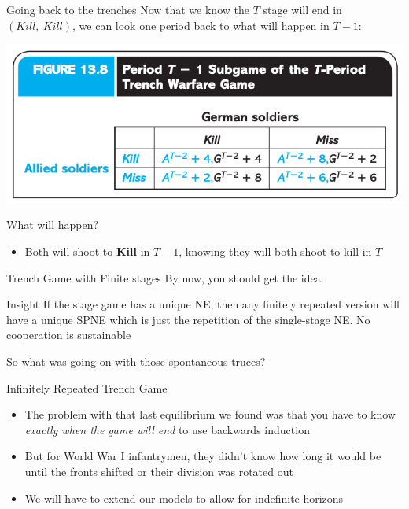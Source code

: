 \begin{frame}{Going back to the trenches}
  Now that we know the $T$ stage will end in $(Kill, ~Kill)$, we can look one period back to what will happen in $T-1$: 
  \begin{center}
    \includegraphics[width=.7\textwidth]{figures/fig138.png}
  \end{center}
  What will happen?
  \pause
  \begin{itemize}
      \item Both will shoot to \textbf{Kill} in $T-1$, knowing they will both shoot to kill in $T$
  \end{itemize}
\end{frame}

\begin{frame}{Trench Game with Finite stages}
  By now, you should get the idea:
  \begin{block}{Insight}
    If the stage game has a unique NE, then any finitely repeated version will
    have a unique SPNE which is just the repetition of the single-stage NE. No
    cooperation is sustainable 
  \end{block}

  So what was going on with those spontaneous truces?
\end{frame}

\begin{frame}{Infinitely Repeated Trench Game}
  \begin{itemize}
    \item The problem with that last equilibrium we found was that you have to
      know \textit{exactly when the game will end} to use backwards induction 
    \item But for World War I infantrymen, they didn't know how long it would
      be until the fronts shifted or their division was rotated out
    \item We will have to extend our models to allow for 
      \alert{indefinite horizons}
  \end{itemize} 
\end{frame}

